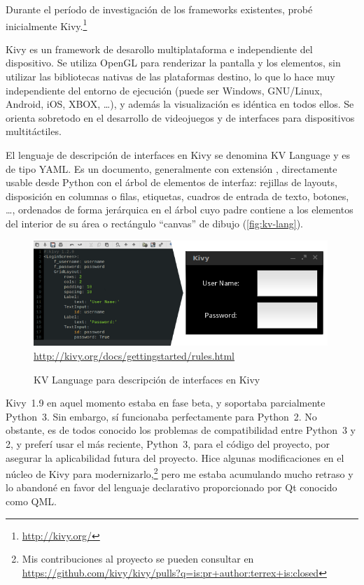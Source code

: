 Durante el período de investigación de los frameworks existentes, probé inicialmente Kivy.\footnote{\url{http://kivy.org/}}

Kivy es un framework de desarollo multiplataforma e independiente del dispositivo. Se utiliza OpenGL para renderizar la pantalla y los elementos, sin utilizar las bibliotecas nativas de las plataformas destino, lo que lo hace muy independiente del entorno de ejecución (puede ser Windows, GNU/Linux, Android, iOS, XBOX, \ldots), y además la visualización es idéntica en todos ellos. Se orienta sobretodo en el desarrollo de videojuegos y de interfaces para dispositivos multitáctiles.

El lenguaje de descripción de interfaces en Kivy se denomina KV Language y es de tipo YAML. Es un documento, generalmente con extensión , directamente usable desde Python con el árbol de elementos de interfaz: rejillas de layouts, disposición en columnas o filas, etiquetas, cuadros de entrada de texto, botones, \ldots, ordenados de forma jerárquica en el árbol cuyo padre contiene a los elementos del interior de su área o rectángulo ``canvas'' de dibujo (\autoref{fig:kv-lang}).

\begin{figure}[htbp]
\centering
\includegraphics[width=0.99\textwidth]{kv-lang}
{\footnotesize\url{http://kivy.org/docs/gettingstarted/rules.html}}
\caption{KV Language para descripción de interfaces en Kivy}
\label{fig:kv-lang}
\end{figure}

Kivy~1.9 en aquel momento estaba en fase beta, y soportaba parcialmente Python~3. Sin embargo, sí funcionaba perfectamente para Python~2. No obstante, es de todos conocido los problemas de compatibilidad entre Python~3 y 2, y preferí usar el más reciente, Python~3, para el código del proyecto, por asegurar la aplicabilidad futura del proyecto. Hice algunas modificaciones en el núcleo de Kivy para modernizarlo,\footnote{Mis contribuciones al proyecto se pueden consultar en \url{https://github.com/kivy/kivy/pulls?q=is:pr+author:terrex+is:closed}} pero me estaba acumulando mucho retraso y lo abandoné en favor del lenguaje declarativo proporcionado por Qt conocido como QML.

